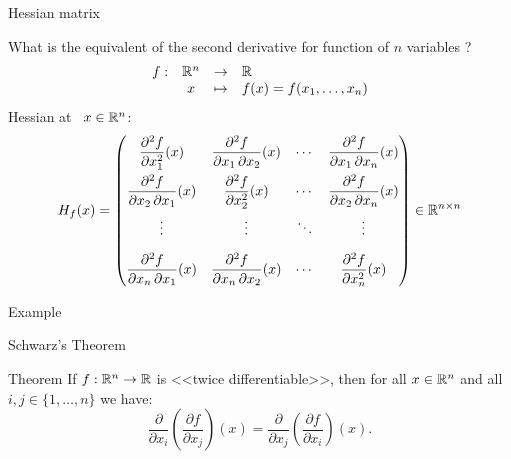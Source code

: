 \documentclass{beamer}
\begin{document}
\begin{frame}[t]{Hessian matrix}
	\grid 

	What is the equivalent of the second derivative for function of $n$ variables ?
			$$
			\begin{array}{cccl}
				f: & \mathbb{R}^n & \to & \mathbb{R} \\
				   & x & \mapsto & f(x) = f(x_1, \dots, x_n)
			\end{array}
			$$
			Hessian at \ $x \in \mathbb{R}^n$:
			\vspace{0.4cm}
			{\small
				$$
				H_f(x) = 
				\begin{pmatrix}
					\dfrac {\partial ^{2}f}{\partial x_{1}^{2}}(x)&{\dfrac {\partial ^{2}f}{\partial x_{1}\,\partial x_{2}}}(x)&\cdots &{\dfrac {\partial ^{2}f}{\partial x_{1}\,\partial x_{n}}(x)}\\[2.2ex]{\dfrac {\partial ^{2}f}{\partial x_{2}\,\partial x_{1}}(x)}&{\dfrac {\partial ^{2}f}{\partial x_{2}^{2}}(x)}&\cdots &{\dfrac {\partial ^{2}f}{\partial x_{2}\,\partial x_{n}}(x)}\\[2.2ex]\vdots &\vdots &\ddots &\vdots \\[2.2ex]{\dfrac {\partial ^{2}f}{\partial x_{n}\,\partial x_{1}}(x)}&{\dfrac {\partial ^{2}f}{\partial x_{n}\,\partial x_{2}}(x)}&\cdots &{\dfrac {\partial ^{2}f}{\partial x_{n}^{2}}(x)}
				\end{pmatrix}
				\in \mathbb{R}^{n \times n}
				$$
			}

\end{frame}

\begin{frame}[t]{Example}
	\grid

\end{frame}

\begin{frame}[t]{Schwarz's Theorem}
	\grid

	\begin{block}{Theorem}
		If $f: \mathbb{R}^n \to \mathbb{R}$ is <<twice differentiable>>, then for all $x \in \mathbb{R}^n$ and all $i,j \in \{1, \dots, n\}$ we have:
$$
\frac{\partial }{\partial x_i}\left(\frac{\partial f}{\partial x_j}\right)(x) =
\frac{\partial }{\partial x_j}\left(\frac{\partial f}{\partial x_i}\right)(x).
$$
	\end{block}

\end{frame}
\end{document}
